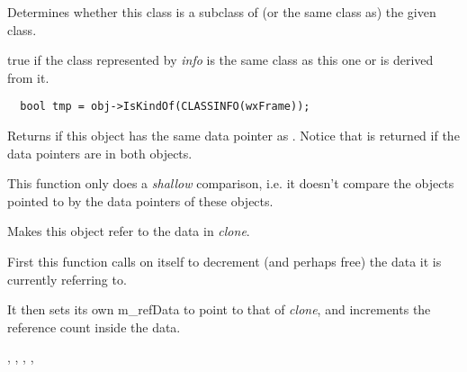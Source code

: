Determines whether this class is a subclass of (or the same class as)
the given class.




true if the class represented by {\it info} is the same class as
this one or is derived from it.


\begin{verbatim}
  bool tmp = obj->IsKindOf(CLASSINFO(wxFrame));
\end{verbatim}

\label{wxobjectissameas}


Returns \true if this object has the same data pointer as . Notice
that \true is returned if the data pointers are \NULL in both objects.

This function only does a \emph{shallow} comparison, i.e. it doesn't compare
the objects pointed to by the data pointers of these objects.

\label{wxobjectref}


Makes this object refer to the data in {\it clone}.




First this function calls  on itself
to decrement (and perhaps free) the data it is currently referring to.

It then sets its own m\_refData to point to that of {\it clone}, and increments the reference count
inside the data.


, ,\rtfsp
{}, ,\rtfsp
{}

\label{wxobjectsetrefdata}

